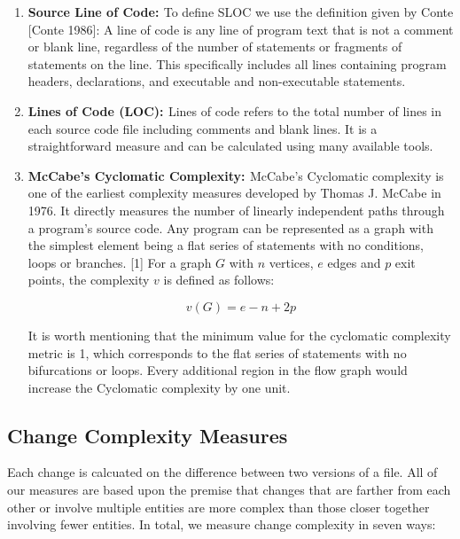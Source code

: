 \documentclass[11pt,twocolumn,a4paper]{article}
\begin{document}
\begin{enumerate}
\item{\bf{Source Line of Code: }} To define SLOC we use the definition given by Conte [Conte 1986]:
A line of code is any line of program text that is not a comment or blank line, regardless of the
number of statements or fragments of statements on the line. This specifically includes all lines containing program headers, declarations, and executable and non-executable statements.

\item{\bf{Lines of Code (LOC): }} Lines of code refers to the total number of lines in each source code file including comments and blank lines. It is a straightforward measure and can be calculated using many available tools.

\item{\bf{McCabe's Cyclomatic Complexity: }}
McCabe’s Cyclomatic complexity is one of the earliest complexity measures developed by Thomas J. McCabe in 1976. It directly measures the number of linearly independent paths through a program's source code. Any program can be represented as a graph with the simplest element being a flat series of statements with no conditions, loops or branches. [1] For a graph $G$ with $n$ vertices, $e$ edges and $p$ exit points, the complexity $v$ is defined as follows:

\begin{equation}
v(G)=e-n+2p
\end{equation}

It is worth mentioning that the minimum value for the cyclomatic complexity metric is 1, which corresponds to the flat series of statements with no bifurcations or loops. Every additional region in the flow graph would increase the Cyclomatic complexity by one unit.



\end{enumerate}


\subsection{Change Complexity Measures}

Each change is calcuated on the difference between two versions of a file.
%
All of our measures are based upon the premise that changes that are farther
from each other or involve multiple entities are more complex than those closer
together involving fewer entities. 
%
In total, we measure change complexity in seven ways:
\end{document}
